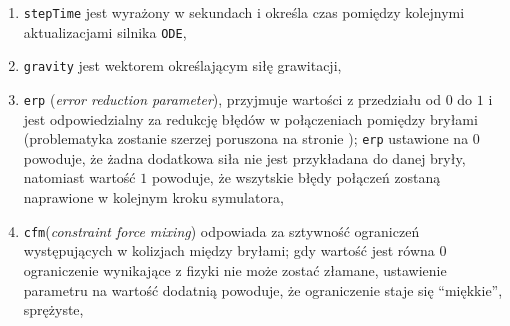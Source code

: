 	\begin {enumerate}
	 \item \texttt{stepTime} jest wyrażony w sekundach i określa czas pomiędzy kolejnymi aktualizacjami silnika \texttt{ODE},
	 \item \texttt{gravity} jest wektorem określającym siłę grawitacji,
	 \item \texttt{erp} (\textit{error reduction parameter}), przyjmuje wartości z przedziału od $0$ do $1$ i jest odpowiedzialny za redukcję błędów w połączeniach pomiędzy bryłami
	  (problematyka zostanie szerzej poruszona na stronie \pageref{fig:joints}); \texttt{erp} ustawione na $0$ powoduje, że żadna dodatkowa siła nie jest przykładana do danej bryły, natomiast wartość $1$
	 powoduje, że wszytskie błędy połączeń zostaną naprawione w kolejnym kroku symulatora,
	 \item \texttt{cfm}(\textit{constraint force mixing})  odpowiada za sztywność ograniczeń występujących w kolizjach między bryłami; gdy wartość jest równa $0$ ograniczenie wynikające z fizyki
nie może zostać złamane, ustawienie parametru na wartość dodatnią powoduje, że ograniczenie staje się ``miękkie'', sprężyste,
	  

\end{enumerate}
